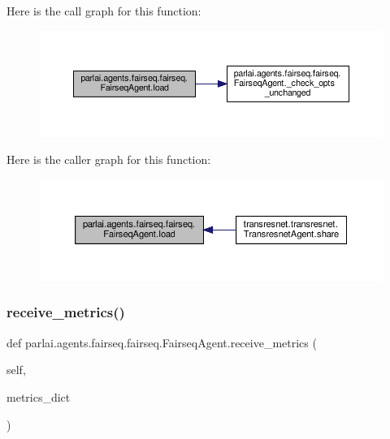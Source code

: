 Here is the call graph for this function\+:
\nopagebreak
\begin{figure}[H]
\begin{center}
\leavevmode
\includegraphics[width=350pt]{classparlai_1_1agents_1_1fairseq_1_1fairseq_1_1FairseqAgent_a20245b04f2a8229809368fb7c43f81e3_cgraph}
\end{center}
\end{figure}
Here is the caller graph for this function\+:
\nopagebreak
\begin{figure}[H]
\begin{center}
\leavevmode
\includegraphics[width=350pt]{classparlai_1_1agents_1_1fairseq_1_1fairseq_1_1FairseqAgent_a20245b04f2a8229809368fb7c43f81e3_icgraph}
\end{center}
\end{figure}
\mbox{\label{classparlai_1_1agents_1_1fairseq_1_1fairseq_1_1FairseqAgent_a29521783f42e437063f9d861133965b0}} 
\subsubsection{\texorpdfstring{receive\+\_\+metrics()}{receive\_metrics()}}
{\footnotesize\ttfamily def parlai.\+agents.\+fairseq.\+fairseq.\+Fairseq\+Agent.\+receive\+\_\+metrics (\begin{DoxyParamCaption}\item[{}]{self,  }\item[{}]{metrics\+\_\+dict }\end{DoxyParamCaption})}

